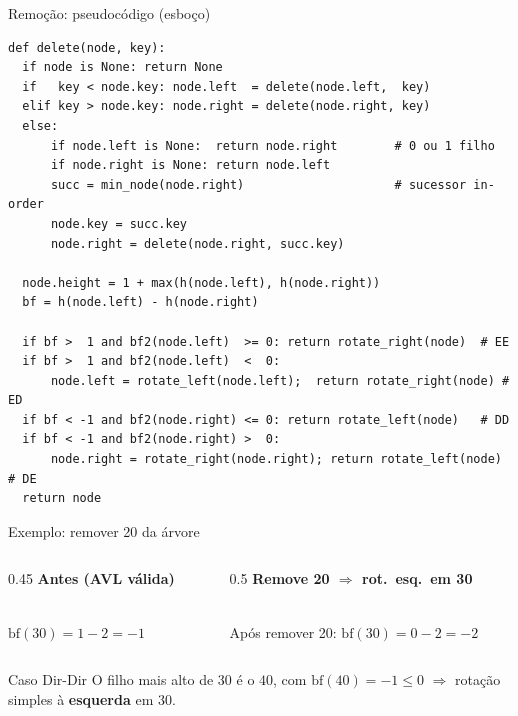 \documentclass[aspectratio=169]{beamer}
\begin{document}
\begin{frame}[fragile,shrink=10]{Remoção: pseudocódigo (esboço)}
\begin{lstlisting}
def delete(node, key):
  if node is None: return None
  if   key < node.key: node.left  = delete(node.left,  key)
  elif key > node.key: node.right = delete(node.right, key)
  else:
      if node.left is None:  return node.right        # 0 ou 1 filho
      if node.right is None: return node.left
      succ = min_node(node.right)                     # sucessor in-order
      node.key = succ.key
      node.right = delete(node.right, succ.key)

  node.height = 1 + max(h(node.left), h(node.right))
  bf = h(node.left) - h(node.right)

  if bf >  1 and bf2(node.left)  >= 0: return rotate_right(node)  # EE
  if bf >  1 and bf2(node.left)  <  0:
      node.left = rotate_left(node.left);  return rotate_right(node) # ED
  if bf < -1 and bf2(node.right) <= 0: return rotate_left(node)   # DD
  if bf < -1 and bf2(node.right) >  0:
      node.right = rotate_right(node.right); return rotate_left(node) # DE
  return node
\end{lstlisting}
\end{frame}

\begin{frame}{Exemplo: remover 20 da árvore}
  \begin{columns}[T]
    \begin{column}{0.45\textwidth}
      \centering \textbf{Antes (AVL válida)}\\[2pt]
      \\
      \scriptsize $\mathrm{bf}(30)=1-2=-1$ \checkmark
    \end{column}
    \begin{column}{0.5\textwidth}
      \centering \textbf{Remove 20 $\Rightarrow$ rot.\ esq.\ em 30}\\[2pt]
      \\
      \scriptsize Após remover 20: $\mathrm{bf}(30)=0-2=-2$
    \end{column}
  \end{columns}
  \vspace{2pt}
  \begin{exampleblock}{Caso Dir-Dir}
    O filho mais alto de $30$ é o $40$, com $\mathrm{bf}(40)=-1\le 0$
    $\Rightarrow$ rotação simples à \textbf{esquerda} em $30$.
  \end{exampleblock}
\end{frame}
\end{document}
